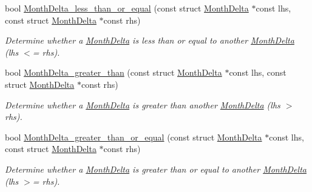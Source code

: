 \begin{DoxyCompactItemize}
bool \hyperlink{month-delta_8h_a5fd5dc59d42e27e3be82bff093be6f6f}{\-Month\-Delta\-\_\-less\-\_\-than\-\_\-or\-\_\-equal} (const struct \hyperlink{structMonthDelta}{\-Month\-Delta} $\ast$const lhs, const struct \hyperlink{structMonthDelta}{\-Month\-Delta} $\ast$const rhs)
\begin{DoxyCompactList}\small\item\em \-Determine whether a \hyperlink{structMonthDelta}{\-Month\-Delta} is less than or equal to another \hyperlink{structMonthDelta}{\-Month\-Delta} (lhs $<$= rhs). \end{DoxyCompactList}\item 
bool \hyperlink{month-delta_8h_ad593c05a77acc33e936064942494391b}{\-Month\-Delta\-\_\-greater\-\_\-than} (const struct \hyperlink{structMonthDelta}{\-Month\-Delta} $\ast$const lhs, const struct \hyperlink{structMonthDelta}{\-Month\-Delta} $\ast$const rhs)
\begin{DoxyCompactList}\small\item\em \-Determine whether a \hyperlink{structMonthDelta}{\-Month\-Delta} is greater than another \hyperlink{structMonthDelta}{\-Month\-Delta} (lhs $>$ rhs). \end{DoxyCompactList}\item 
bool \hyperlink{month-delta_8h_a3f943a75a1b03dddd0749fc5481caa40}{\-Month\-Delta\-\_\-greater\-\_\-than\-\_\-or\-\_\-equal} (const struct \hyperlink{structMonthDelta}{\-Month\-Delta} $\ast$const lhs, const struct \hyperlink{structMonthDelta}{\-Month\-Delta} $\ast$const rhs)
\begin{DoxyCompactList}\small\item\em \-Determine whether a \hyperlink{structMonthDelta}{\-Month\-Delta} is greater than or equal to another \hyperlink{structMonthDelta}{\-Month\-Delta} (lhs $>$= rhs). \end{DoxyCompactList}\end{DoxyCompactItemize}


